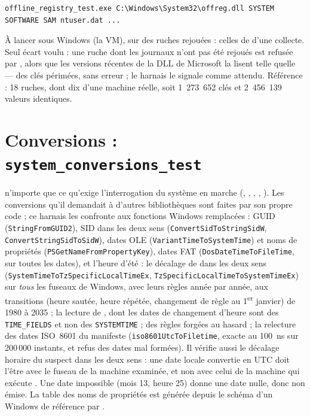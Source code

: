 \documentclass[11pt,a4paper,oneside]{report}
\begin{document}
\begin{lstlisting}
offline_registry_test.exe C:\Windows\System32\offreg.dll SYSTEM SOFTWARE SAM ntuser.dat ...
\end{lstlisting}

À lancer sous Windows (la VM), sur des ruches rejouées : celles de
 d'une collecte. Seul écart voulu : une ruche dont les
journaux n'ont pas été rejoués est refusée par \wac{}, alors que les versions
récentes de la DLL de Microsoft la lisent telle quelle — des clés périmées,
sans erreur ; le harnais le signale comme attendu. Référence : 18 ruches, dont
dix d'une machine réelle, soit 1~273~652 clés et 2~456~139 valeurs identiques.

\section{Conversions : \texttt{system\_conversions\_test}}

\wac{} n'importe que ce qu'exige l'interrogation du système en marche
(, , , ,
). Les conversions qu'il demandait à d'autres bibliothèques
sont faites par son propre code ; ce harnais les confronte aux fonctions
Windows remplacées : GUID (\texttt{StringFromGUID2}), SID dans les deux sens
(\texttt{ConvertSidToStringSidW}, \texttt{ConvertStringSidToSidW}), dates OLE
(\texttt{VariantTimeToSystemTime}) et noms de propriétés
(\texttt{PSGetNameFromPropertyKey}), dates FAT
(\texttt{DosDateTimeToFileTime}, sur toutes les dates), et l'heure d'été :
le décalage de \wac{} dans les deux sens (\texttt{SystemTimeToTzSpecificLocalTimeEx},
\texttt{TzSpecificLocalTimeToSystemTimeEx}) sur \emph{tous} les fuseaux de
Windows, avec leurs règles année par année, aux transitions (heure sautée,
heure répétée, changement de règle au 1\textsuperscript{er} janvier) de 1980
à 2035 ; la lecture de , dont les dates de changement d'heure sont des
\texttt{TIME\_FIELDS} et non des \texttt{SYSTEMTIME} ; des règles forgées au
hasard ; la relecture des dates ISO~8601 du manifeste (\texttt{iso8601UtcToFiletime},
exacte au 100~ns sur 200\,000 instants, et refus des dates mal formées). Il vérifie aussi le
décalage horaire du suspect dans les deux sens : une date locale convertie en
UTC doit l'être avec le fuseau de la machine examinée, et non avec celui de la
machine qui exécute \wac{}. Une date impossible (mois 13, heure 25) donne une
date nulle, donc non émise. La table des noms de propriétés est
générée depuis le schéma d'un Windows de référence par
.
\end{document}
